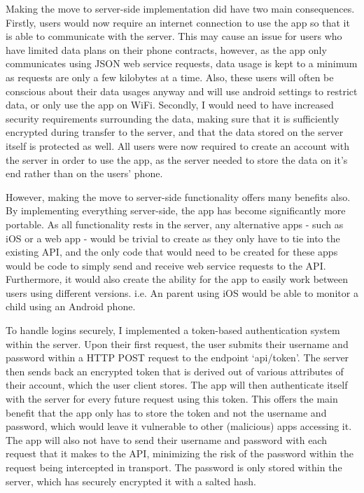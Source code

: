 Making the move to server-side implementation did have two main consequences. 
Firstly, users would now require an internet connection to use the app so that it is able to communicate with the server.
This may cause an issue for users who have limited data plans on their phone contracts, however, as the app only communicates using JSON web service requests, data usage is kept to a minimum as requests are only a few kilobytes at a time.
Also, these users will often be conscious about their data usages anyway and will use android settings to restrict data, or only use the app on WiFi. 
Secondly, I would need to have increased security requirements surrounding the data, making sure that it is sufficiently encrypted during transfer to the server, and that the data stored on the server itself is protected as well.
All users were now required to create an account with the server in order to use the app, as the server needed to store the data on it's end rather than on the users' phone.

However, making the move to server-side functionality offers many benefits also.
By implementing everything server-side, the app has become significantly more portable. 
As all functionality rests in the server, any alternative apps - such as iOS or a web app - would be trivial to create as they only have to tie into the existing API, and the only code that would need to be created for these apps would be code to simply send and receive web service requests to the API.
Furthermore, it would also create the ability for the app to easily work between users using different versions. 
i.e. An parent using iOS would be able to monitor a child using an Android phone.

To handle logins securely, I implemented a token-based authentication system within the server. 
Upon their first request, the user submits their username and password within a HTTP POST request to the endpoint `api/token'.
The server then sends back an encrypted token that is derived out of various attributes of their account, which the user client stores.
The app will then authenticate itself with the server for every future request using this token.
This offers the main benefit that the app only has to store the token and not the username and password, which would leave it vulnerable to other (malicious) apps accessing it.
The app will also not have to send their username and password with each request that it makes to the API, minimizing the risk of the password within the request being intercepted in transport.
The password is only stored within the server, which has securely encrypted it with a salted hash.


